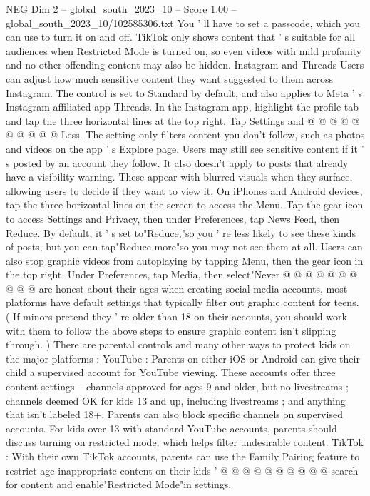 \begin{textsample}{NEG Dim 2 – global\_south\_2023\_10 – Score 1.00 – global\_south\_2023\_10/102585306.txt}
You ' ll have to set a passcode, which you can use to turn it on and off.
TikTok only shows content that ' s suitable for all audiences when Restricted Mode is turned on, so even videos with mild profanity and no other offending content may also be hidden.
Instagram and Threads Users can adjust how much sensitive content they want suggested to them across Instagram.
The control is set to Standard by default, and also applies to Meta ' s Instagram-affiliated app Threads.
In the Instagram app, highlight the profile tab and tap the three horizontal lines at the top right.
Tap Settings and @ @ @ @ @ @ @ @ @ @ Less.
The setting only filters content you don't follow, such as photos and videos on the app ' s Explore page.
Users may still see sensitive content if it ' s posted by an account they follow.
It also doesn't apply to posts that already have a visibility warning.
These appear with blurred visuals when they surface, allowing users to decide if they want to view it.
On iPhones and Android devices, tap the three horizontal lines on the screen to access the Menu.
Tap the gear icon to access Settings and Privacy, then under Preferences, tap News Feed, then Reduce.
By default, it ' s set to"Reduce,"so you ' re less likely to see these kinds of posts, but you can tap"Reduce more"so you may not see them at all.
Users can also stop graphic videos from autoplaying by tapping Menu, then the gear icon in the top right.
Under Preferences, tap Media, then select"Never @ @ @ @ @ @ @ @ @ @ are honest about their ages when creating social-media accounts, most platforms have default settings that typically filter out graphic content for teens. ( If minors pretend they ' re older than 18 on their accounts, you should work with them to follow the above steps to ensure graphic content isn't slipping through. ) There are parental controls and many other ways to protect kids on the major platforms : YouTube : Parents on either iOS or Android can give their child a supervised account for YouTube viewing.
These accounts offer three content settings -- channels approved for ages 9 and older, but no livestreams ; channels deemed OK for kids 13 and up, including livestreams ; and anything that isn't labeled 18+.
Parents can also block specific channels on supervised accounts.
For kids over 13 with standard YouTube accounts, parents should discuss turning on restricted mode, which helps filter undesirable content.
TikTok : With their own TikTok accounts, parents can use the Family Pairing feature to restrict age-inappropriate content on their kids ' @ @ @ @ @ @ @ @ @ @ search for content and enable"Restricted Mode"in settings.

\end{textsample}
